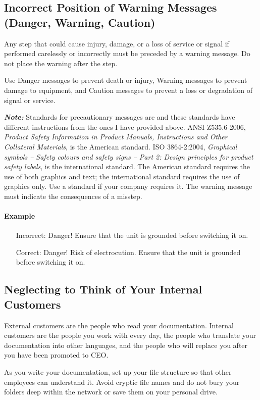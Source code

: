 \documentclass[12pt]{article}
\begin{document}
\subsection{Incorrect Position of Warning Messages (Danger, Warning, Caution)}
Any step that could cause injury, damage, or a loss of service or signal if performed carelessly or incorrectly must be preceded by a warning message. Do not place the warning after the step.

Use Danger messages to prevent death or injury, Warning messages to prevent damage to equipment, and Caution messages to prevent a loss or degradation of signal or service.

\textbf{\emph{Note:}} Standards for precautionary messages are and these standards have different instructions from the ones I have provided above. ANSI Z535.6-2006, \emph{Product Safety Information in Product Manuals, Instructions and Other Collateral Materials}, is the American standard. ISO 3864-2:2004, \emph{Graphical symbols -- Safety colours and safety signs -- Part 2: Design principles for product safety labels}, is the international standard. The American standard requires the use of both graphics and text; the international standard requires the use of graphics only. Use a standard if your company requires it. The warning message must indicate the consequences of a misstep.

\paragraph{Example}

\begin{itemize} \itemsep -2pt
	\item[Incorrect:] Danger! Ensure that the unit is grounded before switching it on.
	\item[Correct:] Danger! Risk of electrocution. Ensure that the unit is grounded before switching it on.
\end{itemize}

\subsection{Neglecting to Think of Your Internal Customers}
External customers are the people who read your documentation. Internal customers are the people you work with every day, the people who translate your documentation into other languages, and the people who will replace you after you have been promoted to CEO.

As you write your documentation, set up your file structure so that other employees can understand it. Avoid cryptic file names and do not bury your folders deep within the network or save them on your personal drive.
\end{document}
